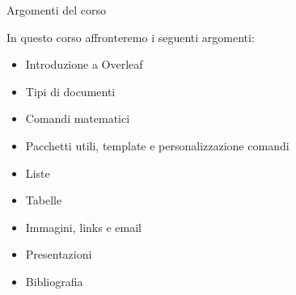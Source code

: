\begin{frame}{Argomenti del corso}

	In questo corso affronteremo i seguenti argomenti:
	\begin{itemize}
		\item Introduzione a Overleaf
		\item Tipi di documenti
		\item Comandi matematici
		\item Pacchetti utili, template e personalizzazione comandi
		\item Liste
		\item Tabelle
		\item Immagini, links e email
		\item Presentazioni
		\item Bibliografia
	\end{itemize}
	
\end{frame}